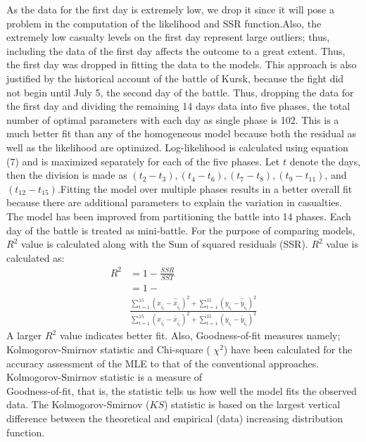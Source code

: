 \documentclass[]{article}
\begin{document}
As the data for the first day is extremely low, we drop it since it will pose a problem in the computation of the likelihood and SSR function.Also, the extremely low casualty levels on the first day represent large outliers; thus, including the data of the first day affects the outcome to a great extent. Thus, the first day was dropped in fitting the data to the models. This approach is also justified by the historical account of the battle of Kursk, because the fight did not begin until July 5, the second day of the battle. Thus, dropping the data for the first day and dividing the remaining 14 days data into five phases, the total number of optimal parameters with each day as single phase is 102. This is a much better fit than any of the homogeneous model because both the residual as well as the likelihood are optimized. Log-likelihood is calculated using equation (7) and is maximized separately for each of the five phases. Let $t$ denote the days, then the division is made as $(t_2-t_3), (t_4-t_6), (t_7-t_8), (t_9-t_{11})$, and $(t_{12}-t_{15})$.Fitting the model over multiple phases results in a better overall fit because there are additional parameters to explain the variation in casualties. The model has been improved from partitioning the battle into 14 phases. Each day of the battle is treated as mini-battle.
For the purpose of comparing models, $R^2$ value is calculated along with the Sum of squared residuals (SSR). $R^2$ value is calculated as:
\tiny
\begin{equation}\label{eq15}
\begin{split}
    R^2&=1-\frac{SSR}{SST}\\
    &=1-\\
    &\frac{\sum_{t=1}^{15}{(\Dot{x}_{i^{'}_t}-\hat{\Dot{x}}_{i^{'}_t})^2+\sum_{t=1}^{15}{(\Dot{y}_{i^{'}_t}-\hat{\Dot{y}}_{i^{'}_t})^2}}}{\sum_{t=1}^{15}{(\Dot{x}_{i^{'}_t}-\overline{\Dot{x}}_{i^{'}_t})^2+\sum_{t=1}^{15}{(\Dot{y}_{i^{'}_t}-\overline{\Dot{y}}_{i^{'}_t})^2}}}
\end{split}
\end{equation}
\normalsize
A larger $R^2$ value indicates better fit. Also, Goodness-of-fit measures namely; Kolmogorov-Smirnov statistic \autocite{Agustino:1986} and Chi-square ( ${\chi}^2$) \autocite{Agustino:1986} have been calculated for the accuracy assessment of the MLE to that of the conventional approaches. Kolmogorov-Smirnov statistic is a measure of \\Goodness-of-fit, that is, the statistic tells us how well the model fits the observed data. The Kolmogorov-Smirnov ($KS$) statistic is based on the largest vertical difference between the theoretical and empirical (data) increasing distribution function.
\end{document}
